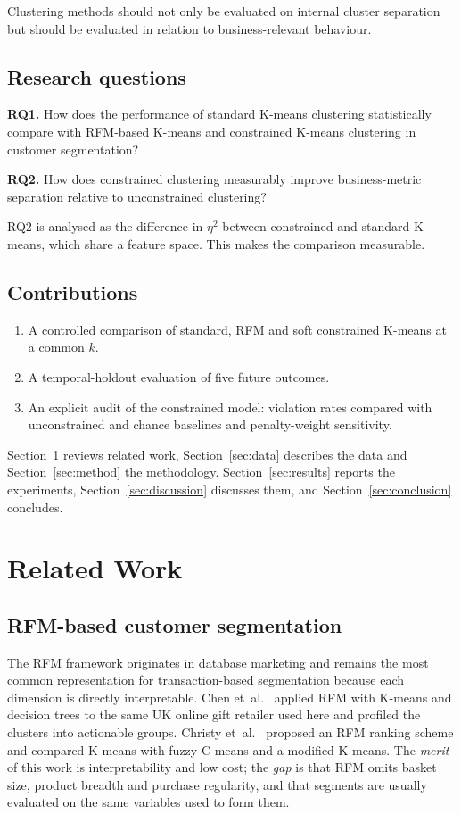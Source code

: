 \documentclass[conference,10pt]{IEEEtran}
\newcommand{\etasq}{\eta^{2}}
\begin{document}
Clustering methods should not only be evaluated on internal cluster separation but should be evaluated in relation to business-relevant behaviour. 

\subsection{Research questions}
\textbf{RQ1.} How does the performance of standard K-means clustering
statistically compare with RFM-based K-means and constrained K-means
clustering in customer segmentation?

\textbf{RQ2.} How does constrained clustering measurably improve
business-metric separation relative to unconstrained clustering?

RQ2 is analysed as the difference in $\etasq$ between constrained and
standard K-means, which share a feature space. This makes the comparison
measurable.

\subsection{Contributions}
\begin{enumerate}
  \item A controlled comparison of standard, RFM and soft constrained K-means
  at a common $k$.
  \item A temporal-holdout evaluation of five future outcomes.
  \item An explicit audit of the constrained model: violation rates compared
  with unconstrained and chance baselines and penalty-weight sensitivity.
\end{enumerate}

Section~\ref{sec:related} reviews related work, Section~\ref{sec:data}
describes the data and Section~\ref{sec:method} the methodology.
Section~\ref{sec:results} reports the experiments, Section~\ref{sec:discussion}
discusses them, and Section~\ref{sec:conclusion} concludes.

\section{Related Work}
\label{sec:related}

\subsection{RFM-based customer segmentation}
The RFM framework originates in database marketing and
remains the most common representation for transaction-based segmentation
\cite{gomes2023review} because each dimension is directly interpretable. Chen et~al.\
\cite{chen2012rfm} applied RFM with K-means and decision trees to the same
UK online gift retailer used here and profiled the clusters into actionable
groups. Christy et~al.\ \cite{christy2021rfm} proposed an RFM ranking scheme
and compared K-means with fuzzy C-means and a modified K-means. The
\emph{merit} of this work is interpretability and low cost; the \emph{gap}
is that RFM omits basket size, product breadth and purchase regularity, and
that segments are usually evaluated on the same variables used to form
them.
\end{document}
